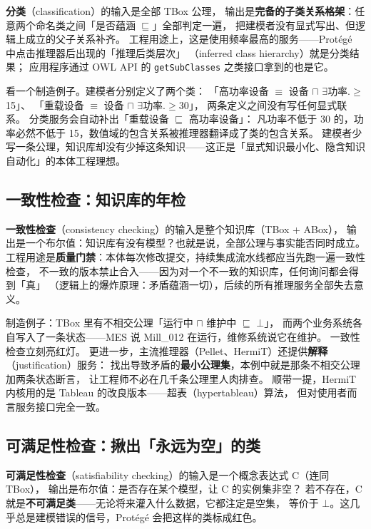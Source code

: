 \textbf{分类}（classification）的输入是全部 TBox 公理，
输出是\textbf{完备的子类关系格架}：任意两个命名类之间「是否蕴涵 \(\sqsubseteq\)」全部判定一遍，
把建模者没有显式写出、但逻辑上成立的父子关系补齐。
工程用途上，这是使用频率最高的服务——Protégé 中点击推理器后出现的「推理后类层次」
（inferred class hierarchy）就是分类结果；
应用程序通过 OWL API 的 \texttt{getSubClasses} 之类接口拿到的也是它。

看一个制造例子。建模者分别定义了两个类：
「高功率设备 \(\equiv\) 设备 \(\sqcap\) \(\exists\)功率.\(\ge\)15」、
「重载设备 \(\equiv\) 设备 \(\sqcap\) \(\exists\)功率.\(\ge\)30」，
两条定义之间没有写任何显式联系。
分类服务会自动补出「重载设备 \(\sqsubseteq\) 高功率设备」：
凡功率不低于 30 的，功率必然不低于 15，数值域的包含关系被推理器翻译成了类的包含关系。
建模者少写一条公理，知识库却没有少掉这条知识——这正是「显式知识最小化、隐含知识自动化」的本体工程理想。

\subsection{一致性检查：知识库的年检}

\textbf{一致性检查}（consistency checking）的输入是整个知识库（TBox + ABox），
输出是一个布尔值：知识库有没有模型？也就是说，全部公理与事实能否同时成立。
工程用途是\textbf{质量门禁}：本体每次修改提交，持续集成流水线都应当先跑一遍一致性检查，
不一致的版本禁止合入——因为对一个不一致的知识库，任何询问都会得到「真」
（逻辑上的爆炸原理：矛盾蕴涵一切），后续的所有推理服务全部失去意义。

制造例子：TBox 里有不相交公理「运行中 \(\sqcap\) 维护中 \(\sqsubseteq\) \(\bot\)」，
而两个业务系统各自写入了一条状态——MES 说 Mill\_012 在运行，维修系统说它在维护。
一致性检查立刻亮红灯。
更进一步，主流推理器（Pellet、HermiT）还提供\textbf{解释}（justification）服务：
找出导致矛盾的\textbf{最小公理集}，本例中就是那条不相交公理加两条状态断言，
让工程师不必在几千条公理里人肉排查。
顺带一提，HermiT 内核用的是 Tableau 的改良版本——超表（hypertableau）算法，
但对使用者而言服务接口完全一致。

\subsection{可满足性检查：揪出「永远为空」的类}

\textbf{可满足性检查}（satisfiability checking）的输入是一个概念表达式 C（连同 TBox），
输出是布尔值：是否存在某个模型，让 C 的实例集非空？
若不存在，C 就是\textbf{不可满足类}——无论将来灌入什么数据，它都注定是空集，
等价于 \(\bot\)。这几乎总是建模错误的信号，Protégé 会把这样的类标成红色。

